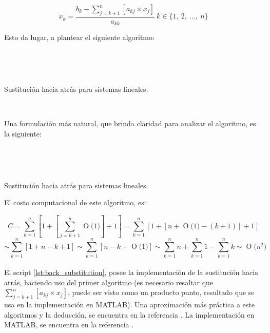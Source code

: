 \documentclass[11pt, spanish]{article}
\newcommand{\BigO}[1]{\ensuremath{\operatorname{O}\bigl(#1\bigr)}}
\begin{document}
\begin{enumerate}
\begin{itemize}
$$x_{k} = \frac{b_{k} - \sum_{j = k + 1}^{n}\left[ a_{kj} \times x_j\right]}{a_{kk}}\ k \in \{ 1,\ 2,\ \dots,\ n \}$$

Esto da lugar, a plantear el siguiente algoritmo:\\

\begin{algorithm}[H]
 \
 
 \
 \caption{Sustitución hacia atrás para sistemas lineales.}
\end{algorithm}\

Una formulación más natural, que brinda claridad para analizar el algoritmo, es la siguiente:\\

\begin{algorithm}[H]
 \KwData{Un vector $b \in \mathbb{R}^n$}
 \
 
 \
 \caption{Sustitución hacia atrás para sistemas lineales.}
\end{algorithm}

\newpage

El costo computacional de este algoritmo, es:

$$C = \sum_{k = 1}^{n} \left[ 1 + \left[\sum_{j = k +1}^{n} \BigO{1} \right] + 1\right] = 
\sum_{k = 1}^{n} \left[ 1 + \left[n + \BigO{1} - (k + 1) \right] + 1\right]$$
$$\sim \sum_{k = 1}^{n} \left[ 1 + n - k + 1\right] \sim \sum_{k = 1}^{n} \left[n - k + \BigO{1} \right] \sim \sum_{k = 1}^{n}  n  + \sum_{k = 1}^{n} 1 - \sum_{k = 1}^{n} k\sim \BigO{n^2}$$\\

El script \ref{lst:back_substitution}, posee la implementación de la sustitución hacia atrás, haciendo uso del primer algoritmo (es necesario resaltar que $\sum_{j = k + 1}^{n}\left[ a_{kj} \times x_j\right]$, puede ser visto como un producto punto, resultado que se usa en la implementación en \textsc{MATLAB}). Una aproximación más práctica a este algoritmos y la deducción, se encuentra en la referencia \cite{ascher2011numerical}. La implementación en \textsc{MATLAB}, se encuentra en la referencia \cite{mathews1999matlab}. \\


\end{itemize}
\end{enumerate}
\end{document}
